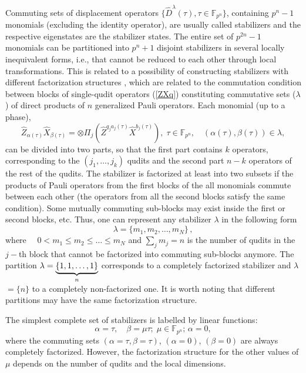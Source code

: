 \documentclass{article}
\begin{document}
Commuting sets of displacement operators $\{\hat{D}^{\lambda }(\tau ),\tau
\in \mathbb{F}_{p^{n}}\}$, containing $p^{n}-1$ monomials (excluding the
identity operator), are usually called stabilizers and the respective
eigenstates are the stabilizer states. The entire set of $p^{2n}-1$
monomials can be partitioned into $p^{n}+1$ disjoint stabilizers in several
locally inequivalent forms, i.e., that cannot be reduced to each other
through local transformations. This is related to a possibility of
constructing stabilizers with different factorization structures \cite%
{factor1,factor2}, which are related to the commutation condition between
blocks of single-qudit operators (\ref{ZXq}) constituting commutative sets ($%
\lambda $) of direct products of $n$ generalized Pauli operators. Each
monomial (up to a phase), 
\begin{equation*}
\hat{Z}_{\alpha (\tau )}\hat{X}_{\beta (\tau )}=\otimes \Pi _{j}\left( \hat{Z%
}^{q_{j}a_{j}(\tau )}\hat{X}^{b_{j}(\tau )}\right) ,\;\tau \in \mathbb{F}%
_{p^{n}},\quad \left( \alpha (\tau ),\beta (\tau )\right) \in \lambda ,
\end{equation*}%
can be divided into two parts, so that the first part contains $k$
operators, corresponding to the $(j_{1},\ldots ,j_{k})$ qudits and the
second part $n-k$ operators of the rest of the qudits. The stabilizer is
factorized at least into two subsets if the products of Pauli operators from
the first blocks of the all monomials commute between each other (the
operators from all the second blocks satisfy the same condition). Some
mutually commuting sub-blocks may exist inside the first or second blocks,
etc. Thus, one can represent any stabilizer $\lambda $ in the following form 
\begin{equation}
\lambda =\{m_{1},m_{2},\ldots ,m_{N}\}\,,  \label{curve_part}
\end{equation}%
where $\quad 0<m_{1}\leq m_{2}\leq \ldots \leq m_{N}$ and $\sum_{j}m_{j}=n$
is the number of qudits in the $j-$th block that cannot be factorized into
commuting sub-blocks anymore. The partition $\lambda =\underbrace{%
\{1,1,\ldots ,1\}}_{n}$ corresponds to a completely factorized stabilizer
and $\lambda $ $=\{n\}$ to a completely non-factorized one. It is worth
noting that different partitions may have the same factorization structure.

The simplest complete set of stabilizers is labelled by linear functions: 
\begin{equation}
\alpha =\tau ,\quad \beta =\mu \tau ;\;\mu \in \mathbb{F}_{p^{n}}\text{; }%
\alpha =0,  \label{rays}
\end{equation}%
where the commuting sets $\left( \alpha =\tau ,\beta =\tau \right) $, $%
\left( \alpha =0\right) $, $\left( \beta =0\right) $ are always completely
factorized. However, the factorization structure for the other values of $%
\mu $ depends on the number of qudits and the local dimensions.
\end{document}
